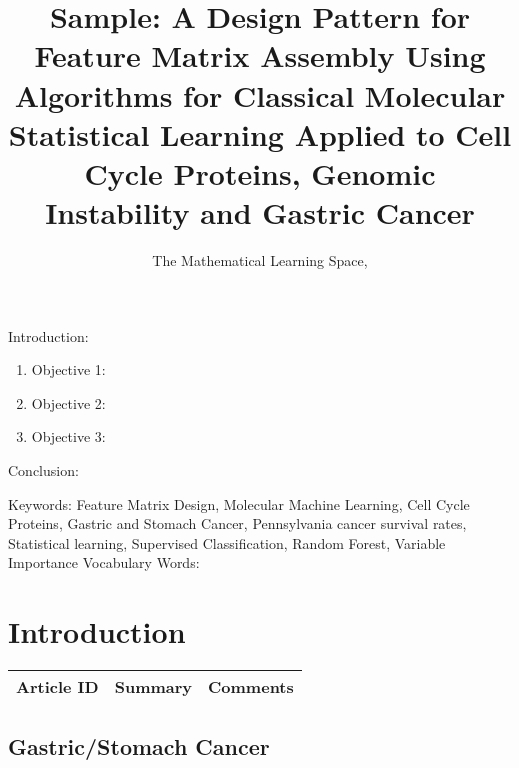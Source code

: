 
\twocolumn
\scriptsize
\begin{frontmatter}
		\title{Sample: A Design Pattern for Feature Matrix Assembly Using Algorithms for Classical Molecular Statistical Learning Applied to Cell Cycle Proteins, Genomic Instability and Gastric Cancer }
		\author{The Mathematical Learning Space, }
		\address{The Mathematical Learning Space}
\end{frontmatter}	

Introduction:
\begin{enumerate}
\item Objective 1:
\item Objective 2:
\item Objective 3:
\end{enumerate}
Conclusion:

Keywords: Feature Matrix Design, Molecular Machine Learning, Cell Cycle Proteins, Gastric and Stomach Cancer, Pennsylvania cancer survival rates, Statistical learning, Supervised Classification, Random Forest, Variable Importance 
Vocabulary Words:

\section{Introduction}

\begin{table}[H]\centering
	\begin{tabular}{p{1cm}p{4cm}p{3cm}}
		Article ID & Summary & Comments\\
		\hline
		\hline
	\end{tabular}
\end{table}


\subsection{Gastric/Stomach Cancer}

